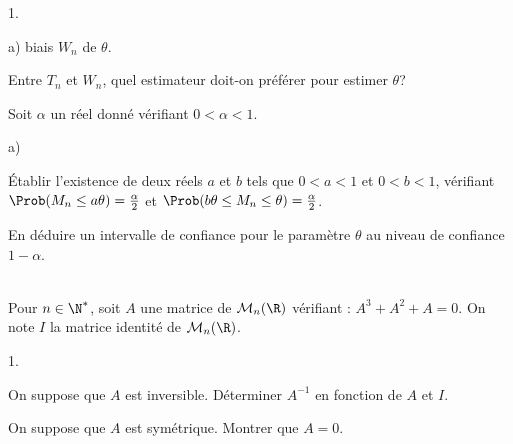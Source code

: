 \documentclass[11pt]{article}%
\begin{document}
\begin{exerciceAP}
\begin{noliste}{1.}
\begin{noliste}{a)}
      biais $W_n$ de $\theta$. 
    \item Entre $T_n$ et $W_n$, quel estimateur doit-on préférer pour
      estimer $\theta$?  
    \end{noliste}
  \item Soit $\alpha$ un réel donné vérifiant $0 < \alpha < 1$. 
    \begin{noliste}{a)}
    \setlength{\itemsep}{2mm}
    \item Établir l'existence de deux réels $a$ et $b$ tels que $0 < a
      < 1$ et $0 < b < 1$, vérifiant $\Prob(M_n \leq a \theta)=
      \frac{\alpha}{2}$ et $\Prob(b  \theta  \leq M_n \leq \theta)=
      \frac{\alpha}{2}$. 
    \item En déduire un intervalle de confiance pour le paramètre
      $\theta$ au niveau de confiance $1-\alpha$.
    \end{noliste}
  \end{noliste}
\end{exerciceAP}


\begin{exerciceSP}~\\
  Pour $n \in \N^*$, soit $A$ une matrice de $\mathcal{M}_n(\R)$
  vérifiant : $A^3+A^2+A=0$. On note $I$ la matrice identité de
  $\mathcal{M}_n(\R)$.
  \begin{noliste}{1.}
    \setlength{\itemsep}{2mm}
  \item On suppose que $A$ est inversible. Déterminer $A^{-1}$ en
    fonction de $A$ et $I$.
  \item On suppose que $A$ est symétrique. Montrer que $A=0$.
  \end{noliste}
\end{exerciceSP}


\newpage


\end{document}
